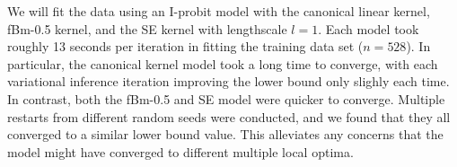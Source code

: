 \documentclass[showframe,11pt]{report}\usepackage[]{graphicx}\usepackage{xcolor}
\begin{document}
We will fit the data using an I-probit model with the canonical linear kernel, fBm-0.5 kernel, and the SE kernel with lengthscale $l=1$.
Each model took roughly 13 seconds per iteration in fitting the training data set ($n=528$).
In particular, the canonical kernel model took a long time to converge, with each variational inference iteration improving the lower bound only slighly each time.
In contrast, both the fBm-0.5 and SE model were quicker to converge.
Multiple restarts from different random seeds were conducted, and we found that they all converged to a similar lower bound value.
This alleviates any concerns that the model might have converged to different multiple local optima.
\end{document}
